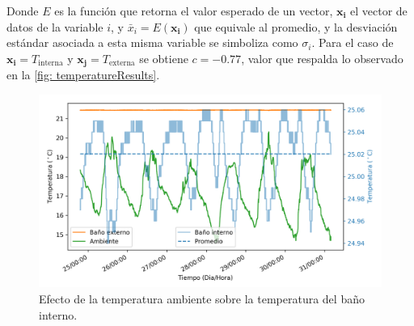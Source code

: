 	Donde $E$ es la funci\'on que retorna el valor esperado de un vector, $\mathbf{x_i}$ el vector de datos de la variable $i$, y $\bar{x}_i = E(\mathbf{x_i})$ que equivale al promedio, y la desviaci\'on est\'andar asociada a esta misma variable se simboliza como $\sigma_i$. Para el caso de $\mathbf{x_i} = T_\text{interna}$ y $\mathbf{x_j} = T_\text{externa}$ se obtiene $c = -0.77$, valor que respalda lo observado en la \autoref{fig: temperatureResults}.
	
	\begin{figure}[h]
		\centering
		\includegraphics[width=\linewidth]{../Data/TemperatureStability/temperatureStability}
		\caption{Efecto de la temperatura ambiente sobre la temperatura del baño interno.}
		\label{fig: temperatureResults}
	\end{figure}